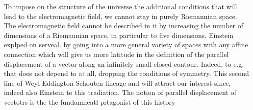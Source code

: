 \documentclass[draft]{article}
\begin{document}
To impose on the structure of the universe the additional conditions that will lead to the electromagnetic field, we cannot stay in purely Riemannian space. The electromagnetic field cannot be described in it  by increasing the number of dimensions of a Riemannian space, in particular to five dimensions. Einstein explped on serveal. by going into a more general variety of spaces with any affine connection \Gtmn which will give us more latitude in the definition of the parallel displacement of a vector along an infinitely small closed contour. Indeed, to e.g.  that does not depend to \gmn at all, dropping the conditions of symmetry\etc. This second line of Weyl-Eddington-Schouten lineage and will attract our interest since, indeed also Einstein to this tradiation. The notion of parallel displacement of vectotrs is the the fundamneatl prtagonist of this history
\end{document}
